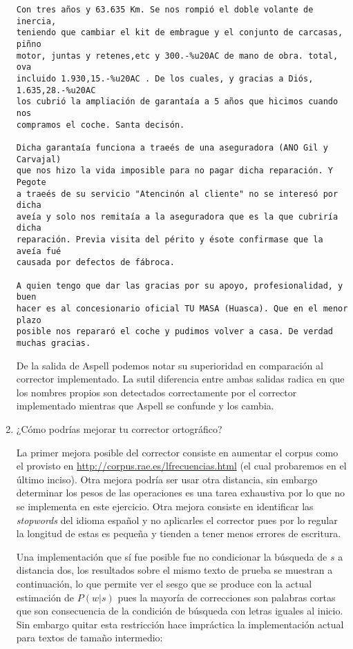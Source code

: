 \documentclass[paper=letter, fontsize=11pt]{scrartcl}
\numberwithin{equation}{section} %
\numberwithin{figure}{section} %
\numberwithin{table}{section} %
\begin{document}
\begin{enumerate}
\begin{verbatim}
Con tres años y 63.635 Km. Se nos rompió el doble volante de inercia,
teniendo que cambiar el kit de embrague y el conjunto de carcasas, piñno
motor, juntas y retenes,etc y 300.-%u20AC de mano de obra. total, ova
incluido 1.930,15.-%u20AC . De los cuales, y gracias a Diós, 1.635,28.-%u20AC 
los cubrió la ampliación de garantaía a 5 años que hicimos cuando nos
compramos el coche. Santa decisón.

Dicha garantaía funciona a traeés de una aseguradora (ANO Gil y Carvajal)
que nos hizo la vida imposible para no pagar dicha reparación. Y Pegote 
a traeés de su servicio "Atencinón al cliente" no se interesó por dicha
aveía y solo nos remitaía a la aseguradora que es la que cubriría dicha
reparación. Previa visita del périto y ésote confirmase que la aveía fué
causada por defectos de fábroca.

A quien tengo que dar las gracias por su apoyo, profesionalidad, y buen
hacer es al concesionario oficial TU MASA (Huasca). Que en el menor plazo
posible nos repararó el coche y pudimos volver a casa. De verdad muchas gracias.
\end{verbatim}

De la salida de Aspell podemos notar su superioridad en comparación al corrector implementado. La sutil diferencia entre ambas salidas radica en que los nombres propios son detectados correctamente por el corrector implementado mientras que Aspell se confunde y los cambia.


\item ¿Cómo podrías mejorar tu corrector ortográfico?

La primer mejora posible del corrector consiste en aumentar el corpus como el provisto en \url{http://corpus.rae.es/lfrecuencias.html} (el cual probaremos en el último inciso). Otra mejora podría ser usar otra distancia, sin embargo determinar los pesos de las operaciones es una tarea exhaustiva por lo que no se implementa en este ejercicio. Otra mejora consiste en identificar las \textit{stopwords} del idioma español y no aplicarles el corrector pues por lo regular la longitud de estas es pequeña y tienden a tener menos errores de escritura. 

Una implementación que sí fue posible fue no condicionar la búsqueda de $s$ a distancia dos, los resultados sobre el mismo texto de prueba se muestran a continuación, lo que permite ver el sesgo que se produce con la actual estimación de $P(w|s)$ pues la mayoría de correcciones son palabras cortas que son consecuencia de la condición de búsqueda con letras iguales al inicio. Sin embargo quitar esta restricción hace impráctica la implementación actual para textos de tamaño intermedio:


\end{enumerate}
\end{document}
